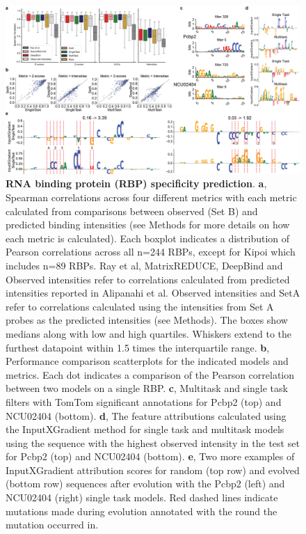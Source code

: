 \begin{figure}[p]
    \centering
    \includegraphics[width=\textwidth]{1_figures-and-files/suppfigure2.png}
    \caption[RBP specificity prediction]{\textbf{RNA binding protein (RBP) specificity prediction}. \textbf{a}, Spearman correlations across four different metrics with each metric calculated from comparisons between observed (Set B) and predicted binding intensities (see Methods for more details on how each metric is calculated). Each boxplot indicates a distribution of Pearson correlations across all n=244 RBPs, except for Kipoi which includes n=89 RBPs. Ray et al, MatrixREDUCE, DeepBind and Observed intensities refer to correlations calculated from predicted intensities reported in Alipanahi et al. Observed intensities and SetA refer to correlations calculated using the intensities from Set A probes as the predicted intensities (see Methods). The boxes show medians along with low and high quartiles. Whiskers extend to the furthest datapoint within 1.5 times the interquartile range. \textbf{b}, Performance comparison scatterplots for the indicated models and metrics. Each dot indicates a comparison of the Pearson correlation between two models on a single RBP. \textbf{c}, Multitask and single task filters with TomTom significant annotations for Pcbp2 (top) and NCU02404 (bottom). \textbf{d}, The feature attributions calculated using the InputXGradient method for single task and multitask models using the sequence with the highest observed intensity in the test set for Pcbp2 (top) and NCU02404 (bottom). \textbf{e}, Two more examples of InputXGradient attribution scores for random (top row) and evolved (bottom row) sequences after evolution with the Pcbp2 (left) and NCU02404 (right) single task models. Red dashed lines indicate mutations made during evolution annotated with the round the mutation occurred in.}
    \label{fig:1 supplementary_2}
\end{figure}

